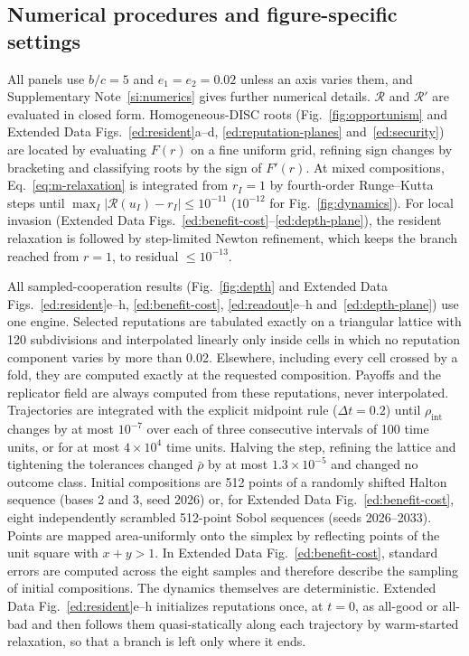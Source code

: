 \documentclass[fleqn,10pt]{wlscirep}
\newcommand{\Rmap}{\mathscr{R}}            %
\theoremstyle{plain}
\begin{document}
\subsection*{Numerical procedures and figure-specific settings}

All panels use $b/c=5$ and $e_1=e_2=0.02$ unless an axis varies them, and Supplementary Note~\ref{si:numerics} gives further numerical details. $\Rmap$ and $\Rmap'$ are evaluated in closed form. Homogeneous-DISC roots (Fig.~\ref{fig:opportunism} and Extended Data Figs.~\ref{ed:resident}a--d, \ref{ed:reputation-planes} and~\ref{ed:security}) are located by evaluating $F(r)$ on a fine uniform grid, refining sign changes by bracketing and classifying roots by the sign of $F'(r)$. At mixed compositions, Eq.~\eqref{eq:m-relaxation} is integrated from $r_I=1$ by fourth-order Runge--Kutta steps until $\max_I|\Rmap(u_I)-r_I|\leq10^{-11}$ ($10^{-12}$ for Fig.~\ref{fig:dynamics}). For local invasion (Extended Data Figs.~\ref{ed:benefit-cost}--\ref{ed:depth-plane}), the resident relaxation is followed by step-limited Newton refinement, which keeps the branch reached from $r=1$, to residual $\leq10^{-13}$.

All sampled-cooperation results (Fig.~\ref{fig:depth} and Extended Data Figs.~\ref{ed:resident}e--h, \ref{ed:benefit-cost}, \ref{ed:readout}e--h and~\ref{ed:depth-plane}) use one engine. Selected reputations are tabulated exactly on a triangular lattice with 120 subdivisions and interpolated linearly only inside cells in which no reputation component varies by more than 0.02. Elsewhere, including every cell crossed by a fold, they are computed exactly at the requested composition. Payoffs and the replicator field are always computed from these reputations, never interpolated. Trajectories are integrated with the explicit midpoint rule ($\Delta t=0.2$) until $\rho_{\mathrm{int}}$ changes by at most $10^{-7}$ over each of three consecutive intervals of 100 time units, or for at most $4\times10^4$ time units. Halving the step, refining the lattice and tightening the tolerances changed $\bar\rho$ by at most $1.3\times10^{-5}$ and changed no outcome class. Initial compositions are 512 points of a randomly shifted Halton sequence (bases 2 and 3, seed 2026) or, for Extended Data Fig.~\ref{ed:benefit-cost}, eight independently scrambled 512-point Sobol sequences\cite{virtanen2020} (seeds 2026--2033). Points are mapped area-uniformly onto the simplex by reflecting points of the unit square with $x+y>1$. In Extended Data Fig.~\ref{ed:benefit-cost}, standard errors are computed across the eight samples and therefore describe the sampling of initial compositions. The dynamics themselves are deterministic. Extended Data Fig.~\ref{ed:resident}e--h initializes reputations once, at $t=0$, as all-good or all-bad and then follows them quasi-statically along each trajectory by warm-started relaxation, so that a branch is left only where it ends.
\end{document}
